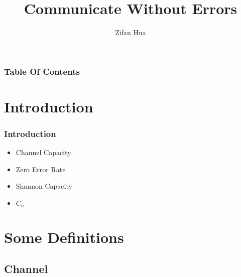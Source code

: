 \documentclass{beamer}
\title{Communicate Without Errors}
\author{Zifan Hua}
\begin{document}
      \frame{\titlepage}

      \begin{frame}
            \frametitle[TOC]{Table Of Contents}
            \tableofcontents
      \end{frame}

      \section{Introduction}

      \begin{frame}
            \frametitle{Introduction}
            \begin{itemize}
                  \item Channel Capacity
                  \item Zero Error Rate
                  \item Shannon Capacity
                  \item $C_{n}$
            \end{itemize}
      \end{frame}

      \section{Some Definitions}

            \subsection{Channel}
\end{document}
